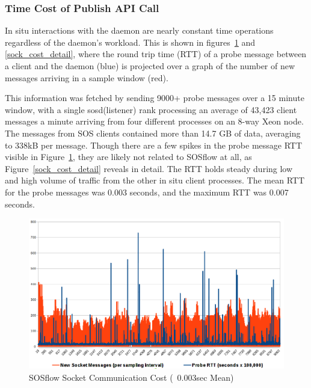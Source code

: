 \subsubsection{Time Cost of Publish API Call} %
In situ interactions with the daemon are nearly constant time
operations regardless of the daemon's workload.
%
This is shown in figures~\ref{sock_cost} and \ref{sock_cost_detail},
where the round trip time (RTT) of a probe message between a client
and the daemon (blue) is projected over a graph of the number of new
messages arriving in a sample window (red).
%
\par
%
This information was fetched by sending 9000+ probe messages over a 15
minute window, with a single sosd(listener) rank processing an average
of 43,423 client messages a minute arriving from four different
processes on an 8-way Xeon node.
%
The messages from SOS clients contained more than 14.7 GB of data,
averaging to 338kB per message.
%
Though there are a few spikes in the probe message RTT visible in
Figure~\ref{sock_cost}, they are likely not related to SOSflow at all,
as Figure~\ref{sock_cost_detail} reveals in detail.
%
The RTT holds steady during low and high volume of traffic from the
other in situ client processes.
%
The mean RTT for the probe messages was 0.003 seconds, and the maximum
RTT was 0.007 seconds.
\begin{figure}[h]
\centering
\includegraphics[width=\columnwidth]{images/icebox_api_cost_when_slam.png}
\caption{SOSflow Socket Communication Cost (~0.003sec Mean)}
\label{sock_cost}
\end{figure}

